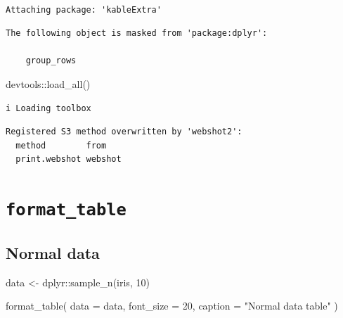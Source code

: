 \documentclass[
]{article}
\newenvironment{Shaded}{\begin{snugshade}}{\end{snugshade}}
\newcommand{\AttributeTok}[1]{\textcolor[rgb]{0.40,0.45,0.13}{#1}}
\newcommand{\DecValTok}[1]{\textcolor[rgb]{0.68,0.00,0.00}{#1}}
\newcommand{\FunctionTok}[1]{\textcolor[rgb]{0.28,0.35,0.67}{#1}}
\newcommand{\NormalTok}[1]{\textcolor[rgb]{0.00,0.23,0.31}{#1}}
\newcommand{\OtherTok}[1]{\textcolor[rgb]{0.00,0.23,0.31}{#1}}
\newcommand{\SpecialCharTok}[1]{\textcolor[rgb]{0.37,0.37,0.37}{#1}}
\newcommand{\StringTok}[1]{\textcolor[rgb]{0.13,0.47,0.30}{#1}}
\begin{document}
\begin{verbatim}

Attaching package: 'kableExtra'
\end{verbatim}

\begin{verbatim}
The following object is masked from 'package:dplyr':

    group_rows
\end{verbatim}

\begin{Shaded}
\begin{Highlighting}[]
\NormalTok{devtools}\SpecialCharTok{::}\FunctionTok{load\_all}\NormalTok{()}
\end{Highlighting}
\end{Shaded}

\begin{verbatim}
i Loading toolbox
\end{verbatim}

\begin{verbatim}
Registered S3 method overwritten by 'webshot2':
  method        from   
  print.webshot webshot
\end{verbatim}

\newpage

\hypertarget{format_table}{%
\section{\texorpdfstring{\texttt{format\_table}}{format\_table}}\label{format_table}}

\hypertarget{normal-data}{%
\subsection{Normal data}\label{normal-data}}

\begin{Shaded}
\begin{Highlighting}[]
\NormalTok{data }\OtherTok{\textless{}{-}}\NormalTok{ dplyr}\SpecialCharTok{::}\FunctionTok{sample\_n}\NormalTok{(iris, }\DecValTok{10}\NormalTok{)}

\FunctionTok{format\_table}\NormalTok{(}
  \AttributeTok{data =}\NormalTok{ data,}
  \AttributeTok{font\_size =} \DecValTok{20}\NormalTok{,}
  \AttributeTok{caption =} \StringTok{"Normal data table"}
\NormalTok{  )}
\end{Highlighting}
\end{Shaded}
\end{document}
